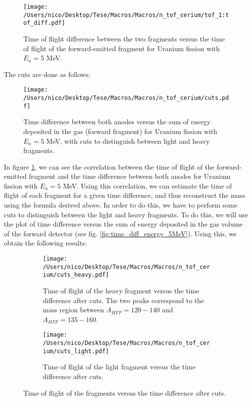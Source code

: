 \documentclass{article}
\begin{document}
\begin{figure}[H]
    \centering
    \texttt{[image: /Users/nico/Desktop/Tese/Macros/Macros/n\_tof\_cerium/tof\_1:tof\_diff.pdf]}
    \caption{Time of flight difference between the two fragments versus the time of flight of the forward-emitted fragment for Uranium fission with $E_n=5$ MeV.}
    \label{fig:mass_reconstruction_5MeV}
\end{figure}
The cuts are done as follows:
\begin{figure}
    \centering
    \texttt{[image: /Users/nico/Desktop/Tese/Macros/Macros/n\_tof\_cerium/cuts.pdf]}
    \caption{Time difference between both anodes versus the sum of energy deposited in the gas (forward fragment) for Uranium fission with $E_n=5$ MeV, with cuts to distinguish between light and heavy fragments.}
    \label{cuts}
\end{figure}
In figure \ref{fig:mass_reconstruction_5MeV}, we can see the correlation between the time of flight of the forward-emitted fragment and the time difference between both anodes for Uranium fission with $E_n=5$ MeV. Using this correlation, we can estimate the time of flight of each fragment for a given time difference, and thus reconstruct the mass using the formula derived above. In order to do this, we have to perform some cuts to distinguish between the light and heavy fragments. To do this, we will use the plot of time difference versus the sum of energy deposited in the gas volume of the forward detector (see fig. \ref{fig:time_diff_energy_5MeV}). Using this, we obtain the following results:
\begin{figure}[H]
    \centering
    \begin{subfigure}{0.45\textwidth}
        \centering
        \texttt{[image: /Users/nico/Desktop/Tese/Macros/Macros/n\_tof\_cerium/cuts\_heavy.pdf]}
        \caption{Time of flight of the heavy fragment versus the time difference after cuts. The two peaks correspond to the mass region between  $A_{HFF}=120-140$ and $A_{HFF}=135-160$.}
        \label{fig:mass_heavy_5MeV}
    \end{subfigure}
    \hfill
    \begin{subfigure}{0.45\textwidth}
        \centering
        \texttt{[image: /Users/nico/Desktop/Tese/Macros/Macros/n\_tof\_cerium/cuts\_light.pdf]}
        \caption{Time of flight of the light fragment versus the time difference after cuts.}
        \label{fig:mass_light_5MeV}
    \end{subfigure}
    \caption{Time of flight of the fragments versus the time difference after cuts.}
    \label{fig:mass_reconstructed_5MeV}
\end{figure}
\end{document}
